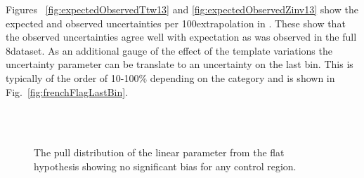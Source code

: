 Figures ~\ref{fig:expectedObservedTtw13} and \ref{fig:expectedObservedZinv13}
show the expected and observed uncertainties per 100\GeV extrapolation in \mht. 
These show that the observed uncertainties agree well with expectation as
was observed in the full 8\TeV dataset. 
As an additional gauge of the effect of the template variations the uncertainty parameter 
can be translate to an uncertainty on the last bin. This is typically
of the order of 10-100\% depending on the category and is shown
in Fig.~\ref{fig:frenchFlagLastBin}.

\begin{figure}[h!]
  \centering
  ~~
  \\
  ~~
  \\
  \caption{\label{fig:pulls13} 
  The pull distribution of the linear parameter from the flat hypothesis showing no significant bias for any control region.}
\end{figure}
